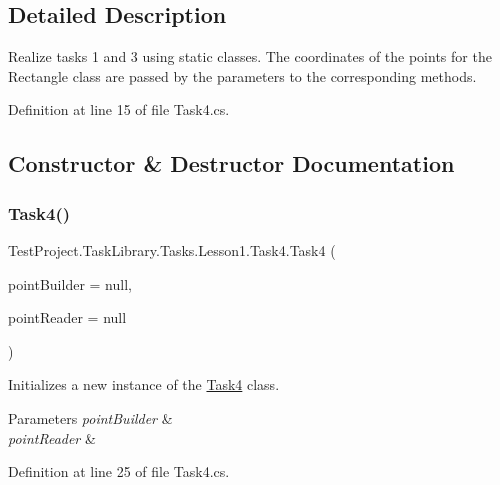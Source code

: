 \subsection{Detailed Description}
Realize tasks 1 and 3 using static classes. The coordinates of the points for the Rectangle class are passed by the parameters to the corresponding methods. 



Definition at line 15 of file Task4.\+cs.



\subsection{Constructor \& Destructor Documentation}
\mbox{\label{class_test_project_1_1_task_library_1_1_tasks_1_1_lesson1_1_1_task4_aa5138429f4e2d9db2bc8f4d353d50cbd}} 
\subsubsection{\texorpdfstring{Task4()}{Task4()}}
{\footnotesize\ttfamily Test\+Project.\+Task\+Library.\+Tasks.\+Lesson1.\+Task4.\+Task4 (\begin{DoxyParamCaption}\item[{I\+Builder$<$ \mbox{\hyperlink{class_test_project_1_1_task_library_1_1_tasks_1_1_lesson1_1_1_models_1_1_point}{Point}} $>$}]{point\+Builder = {\ttfamily null},  }\item[{I\+Reader}]{point\+Reader = {\ttfamily null} }\end{DoxyParamCaption})}



Initializes a new instance of the \mbox{\hyperlink{class_test_project_1_1_task_library_1_1_tasks_1_1_lesson1_1_1_task4}{Task4}} class. 


\begin{DoxyParams}{Parameters}
{\em point\+Builder} & \\
\hline
{\em point\+Reader} & \\
\hline
\end{DoxyParams}


Definition at line 25 of file Task4.\+cs.



